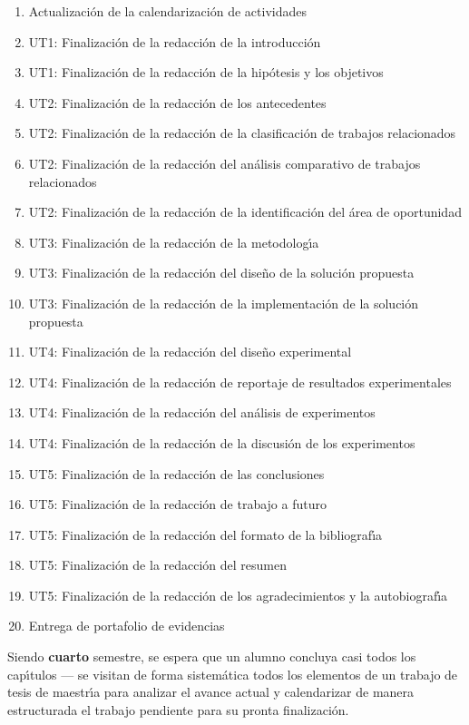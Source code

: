 \documentclass[10 pt]{article}
\begin{document}
\newpage





\newpage



\begin{enumerate}[itemsep=-2pt]
\item Actualizaci\'{o}n de la calendarizaci\'{o}n de actividades
\item UT1: Finalizaci\'{o}n de la redacci\'{o}n de la introducci\'{o}n
\item UT1: Finalizaci\'{o}n de la redacci\'{o}n de la hip\'{o}tesis y los objetivos
\item UT2: Finalizaci\'{o}n de la redacci\'{o}n de los antecedentes
\item UT2: Finalizaci\'{o}n de la redacci\'{o}n de la clasificaci\'{o}n de trabajos relacionados
\item UT2: Finalizaci\'{o}n de la redacci\'{o}n del an\'{a}lisis comparativo de trabajos relacionados
\item UT2: Finalizaci\'{o}n de la redacci\'{o}n de la identificaci\'{o}n del \'{a}rea de oportunidad
\item UT3: Finalizaci\'{o}n de la redacci\'{o}n de la metodolog\'{\i}a
\item UT3: Finalizaci\'{o}n de la redacci\'{o}n del dise\~{n}o de la soluci\'{o}n propuesta
\item UT3: Finalizaci\'{o}n de la redacci\'{o}n de la implementaci\'{o}n de la soluci\'{o}n propuesta
\item UT4: Finalizaci\'{o}n de la redacci\'{o}n del dise\~{n}o experimental
\item UT4: Finalizaci\'{o}n de la redacci\'{o}n de reportaje de resultados experimentales
\item UT4: Finalizaci\'{o}n de la redacci\'{o}n del an\'{a}lisis de experimentos
\item UT4: Finalizaci\'{o}n de la redacci\'{o}n de la discusi\'{o}n de los experimentos
\item UT5: Finalizaci\'{o}n de la redacci\'{o}n de las conclusiones
\item UT5: Finalizaci\'{o}n de la redacci\'{o}n de trabajo a futuro
\item UT5: Finalizaci\'{o}n de la redacci\'{o}n del formato de la bibliograf\'{\i}a
\item UT5: Finalizaci\'{o}n de la redacci\'{o}n del resumen
\item UT5: Finalizaci\'{o}n de la redacci\'{o}n de los agradecimientos y la autobiograf\'{\i}a
\item Entrega de portafolio de evidencias
\end{enumerate}



Siendo {\bf cuarto} semestre, se espera que un alumno concluya casi
todos los cap\'{\i}tulos --- se visitan de forma sistem\'{a}tica todos
los elementos de un trabajo de tesis de maestr\'{\i}a para analizar el
avance actual y calendarizar de manera estructurada el trabajo
pendiente para su pronta finalizaci\'{o}n.


\end{document}
